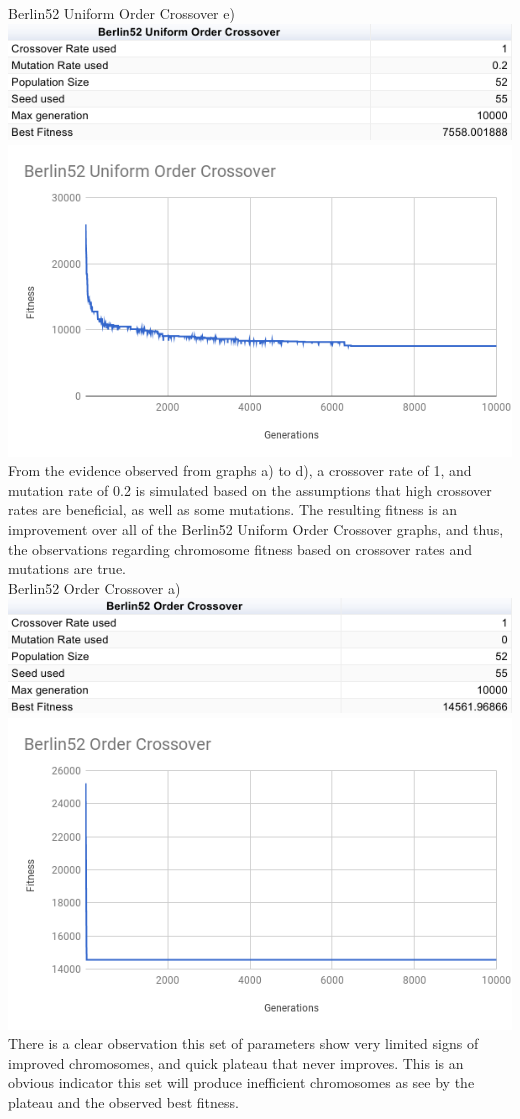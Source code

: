 \documentclass[conference]{IEEEtran}
\begin{document}
Berlin52 Uniform Order Crossover e)
\includegraphics[scale=0.42]{Berlin52/UOC/Berlin52_UOC_e)_table}
\includegraphics[scale=0.42]{Berlin52/UOC/Berlin52_UOC_e)}
From the evidence observed from graphs a) to d), a crossover rate of 1, and mutation rate of 0.2 is simulated based on the assumptions that high crossover rates are beneficial, as well as some mutations. The resulting fitness is an improvement over all of the Berlin52 Uniform Order Crossover graphs, and thus, the observations regarding chromosome fitness based on crossover rates and mutations are true.\\

Berlin52 Order Crossover a)
\includegraphics[scale=0.42]{Berlin52/OC/Berlin52_OC_a)_table}
\includegraphics[scale=0.42]{Berlin52/OC/Berlin52_OC_a)}
There is a clear observation this set of parameters show very limited signs of improved chromosomes, and quick plateau that never improves. This is an obvious indicator this set will produce inefficient chromosomes as see by the plateau and the observed best fitness.\\
\end{document}
